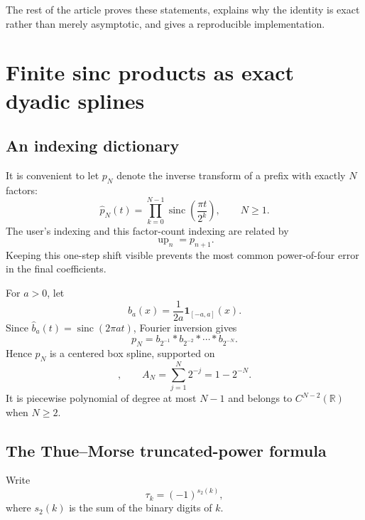 \documentclass[11pt]{article}
\theoremstyle{definition}
\theoremstyle{remark}
\newcommand{\R}{\mathbb R}
\newcommand{\sinc}{\operatorname{sinc}}
\newcommand{\rv}{\operatorname{up}}
\begin{document}
The rest of the article proves these statements, explains why the identity is
exact rather than merely asymptotic, and gives a reproducible implementation.

\section{Finite sinc products as exact dyadic splines}

\subsection{An indexing dictionary}

It is convenient to let \(p_N\) denote the inverse transform of a prefix with
exactly \(N\) factors:
\begin{equation}
 \widehat p_N(t)=\prod_{k=0}^{N-1}
 \sinc\!\left(\frac{\pi t}{2^k}\right),\qquad N\ge1.
 \label{eq:pN-prefix}
\end{equation}
The user's indexing and this factor-count indexing are related by
\begin{equation}
 \boxed{\rv_n=p_{n+1}.}
 \label{eq:index-dictionary}
\end{equation}
Keeping this one-step shift visible prevents the most common power-of-four
error in the final coefficients.

For \(a>0\), let
\begin{equation}
 b_a(x)=\frac{1}{2a}\mathbf 1_{[-a,a]}(x).
 \label{eq:box}
\end{equation}
Since \(\widehat b_a(t)=\sinc(2\pi at)\), Fourier inversion gives
\begin{equation}
 p_N=b_{2^{-1}}*b_{2^{-2}}*\cdots*b_{2^{-N}}.
 \label{eq:box-convolution}
\end{equation}
Hence \(p_N\) is a centered box spline, supported on
\begin{equation}
 [-A_N,A_N],\qquad A_N=\sum_{j=1}^{N}2^{-j}=1-2^{-N}.
 \label{eq:support-radius}
\end{equation}
It is piecewise polynomial of degree at most \(N-1\) and belongs to
\(C^{N-2}(\R)\) when \(N\ge2\).

\subsection{The Thue--Morse truncated-power formula}

Write
\begin{equation}
 \tau_k=(-1)^{s_2(k)},
 \label{eq:tau}
\end{equation}
where \(s_2(k)\) is the sum of the binary digits of \(k\).
\end{document}
